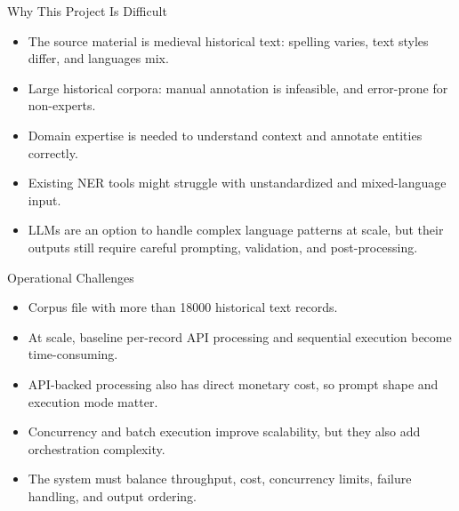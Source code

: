 \documentclass[
        11pt,
        compress,
        xcolor={dvipsnames}
    ]{beamer}
\begin{document}
\begin{frame}{Why This Project Is Difficult}
  \begin{itemize}
    \item The source material is medieval historical text: spelling varies, text styles differ, and languages mix.
    \item Large historical corpora: manual annotation is infeasible, and error-prone for non-experts.
    \item Domain expertise is needed to understand context and annotate entities correctly.
    \item Existing NER tools might struggle with unstandardized and mixed-language input.
    \item LLMs are an option to handle complex language patterns at scale, but their outputs still require careful prompting, validation, and post-processing.
  \end{itemize}
\end{frame}

\begin{frame}{Operational Challenges}
  \begin{itemize}
    \item Corpus file with more than 18000 historical text records.
    \item At scale, baseline per-record API processing and sequential execution become time-consuming.
    \item API-backed processing also has direct monetary cost, so prompt shape and execution mode matter.
    \item Concurrency and batch execution improve scalability, but they also add orchestration complexity.
    \item The system must balance throughput, cost, concurrency limits, failure handling, and output ordering.
  \end{itemize}
\end{frame}
\end{document}

